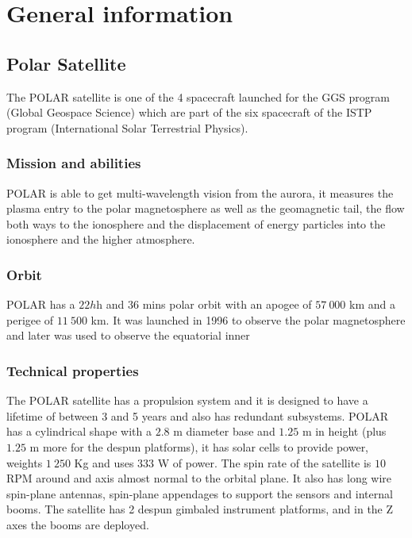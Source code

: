 \documentclass[a4paper,12pt,calibri,oneside,openany]{book}
\theoremstyle{break}
\begin{document}

\frontmatter



\tableofcontents

\mainmatter
\pagestyle{fancy}



\chapter{General information}
\section{Polar Satellite}
The POLAR satellite is one of the 4 spacecraft launched for the GGS program (Global Geospace Science) which are part of the six spacecraft of the ISTP program (International Solar Terrestrial Physics). \\

\subsection{Mission and abilities}
POLAR is able to get multi-wavelength vision from the aurora, it measures the plasma entry to the polar magnetosphere as well as the geomagnetic tail, the flow both ways to the ionosphere and the displacement of energy particles into the ionosphere and the higher atmosphere. \\

\subsection{Orbit}
POLAR has a $22h$h and $36$ mins polar orbit with an apogee of $57\ 000$ km and a perigee of $11\ 500$ km. It was launched in 1996 to observe the polar magnetosphere and later was used to observe the equatorial inner

\subsection{Technical properties}
The POLAR satellite has a propulsion system and it is designed to have a lifetime of between 3 and 5 years and also has redundant subsystems. POLAR has a cylindrical shape with a $2.8$ m diameter base and $1.25$ m in height (plus $1.25$ m more for the despun platforms), it has solar cells to provide power, weights $1\ 250$ Kg and uses $333$ W of power. The spin rate of the satellite is $10$ RPM around and axis almost normal to the orbital plane. It also has long wire spin-plane antennas, spin-plane appendages to support the sensors and internal booms. The satellite has 2 despun gimbaled instrument platforms, and in the Z axes the booms are deployed.\\
\end{document}
